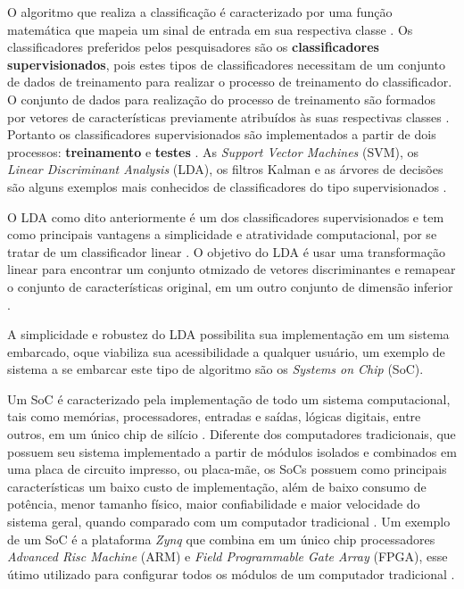 O algoritmo que realiza a classificação é caracterizado por uma função matemática
que mapeia um sinal de entrada em sua respectiva classe \cite{lottephd}. Os classificadores
preferidos pelos pesquisadores são os \textbf{classificadores supervisionados}, pois estes
tipos de classificadores necessitam de um conjunto de dados de treinamento para realizar o processo de treinamento do classificador. O conjunto de dados para realização do processo de treinamento são formados por vetores de características previamente atribuídos às suas respectivas classes \cite{lottephd}. Portanto os classificadores supervisionados são implementados a partir de dois processos: \textbf{treinamento} e \textbf{testes} \cite{Siulybook}. As \textit{Support Vector Machines} (SVM), os \textit{Linear Discriminant Analysis} (LDA), os filtros Kalman e as árvores de decisões são alguns exemplos mais conhecidos de classificadores do tipo supervisionados \cite{Siulybook}.

O LDA como dito anteriormente é um dos classificadores supervisionados e tem como principais vantagens
a simplicidade e atratividade computacional, por se tratar de um classificador linear \cite{patternRecogn}.
O objetivo do LDA é usar uma transformação linear para encontrar um conjunto otmizado de vetores
discriminantes e remapear o conjunto de características
original, em um outro conjunto de dimensão  inferior \cite{ShashoaLDA}.

A simplicidade e robustez do LDA possibilita sua implementação em um sistema embarcado, oque viabiliza sua acessibilidade a qualquer usuário, um exemplo de sistema a se embarcar este tipo de algoritmo são os \textit{Systems on Chip} (SoC).

Um SoC é caracterizado pela implementação de todo um sistema computacional, tais como memórias, processadores, entradas e saídas, lógicas digitais, entre outros, em um único chip de silício \cite{zynqBook}. Diferente dos computadores tradicionais, que possuem seu sistema implementado a partir de módulos isolados e combinados em uma placa de circuito impresso, ou placa-mãe, os SoCs possuem como principais características um baixo custo de implementação, além de baixo consumo de potência, menor tamanho físico, maior confiabilidade e maior velocidade do sistema geral, quando comparado com um computador tradicional \cite{zynqBook}. Um exemplo de um SoC é a plataforma \textit{Zynq} que combina em um único chip processadores \textit{Advanced Risc Machine} (ARM) e \textit{Field Programmable Gate Array} (FPGA), esse útimo utilizado para configurar todos os módulos de um computador tradicional \cite{zynqBook}. 

